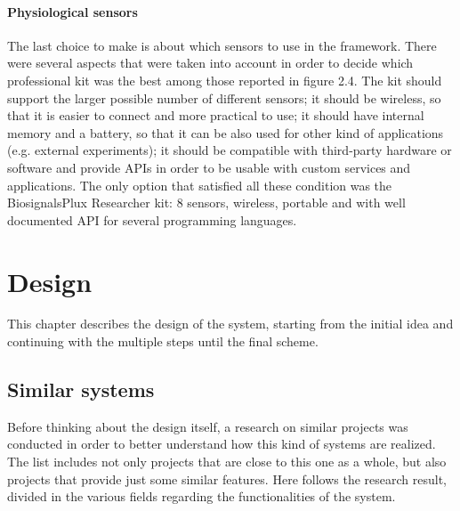 \documentclass[binding=0.6cm,LaM]{sapthesis}
\begin{document}
\subsubsection{Physiological sensors}
The last choice to make is about which sensors to use in the framework.
There were several aspects that were taken into account in order to decide which professional kit was the best among those reported in figure 2.4. The kit should support the larger possible number of different sensors; it should be wireless, so that it is easier to connect and more practical to use; it should have internal memory and a battery, so that it can be also used for other kind of applications (e.g. external experiments); it should be compatible with third-party hardware or software and provide APIs in order to be usable with custom services and applications. The only option that satisfied all these condition was the BiosignalsPlux Researcher kit: 8 sensors, wireless, portable and with well documented API for several programming languages.





\chapter{Design}
This chapter describes the design of the system, starting from the initial idea and continuing with the multiple steps until the final scheme.

\section{Similar systems}
Before thinking about the design itself, a research on similar projects was conducted in order to better understand how this kind of systems are realized. The list includes not only projects that are close to this one as a whole, but also projects that provide just some similar features. Here follows the research result, divided in the various fields regarding the functionalities of the system. 
\end{document}
